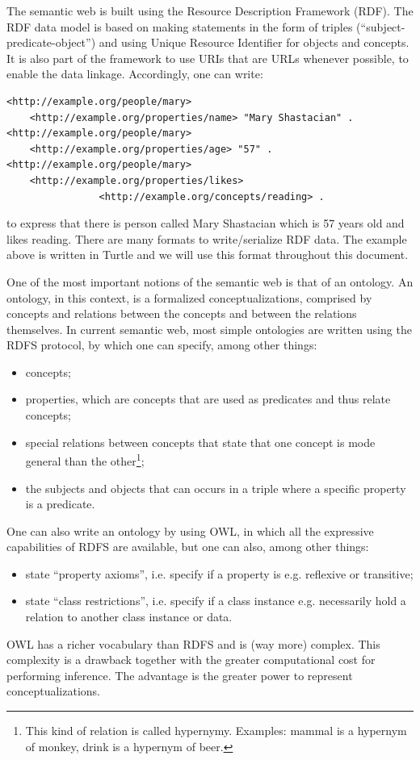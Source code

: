 \documentclass[12pt,fleqn]{article}
\begin{document}
The semantic web is built using the Resource Description Framework (RDF).
The RDF data model is based on making statements in the form of triples
(``subject-predicate-object'') and using Unique Resource Identifier for
objects and concepts.
It is also part of the framework to use URIs that are URLs whenever possible,
to enable the data linkage.
Accordingly, one can write:
\begin{Verbatim}[fontsize=\footnotesize]
<http://example.org/people/mary>
	<http://example.org/properties/name> "Mary Shastacian" .
<http://example.org/people/mary>
	<http://example.org/properties/age> "57" .
<http://example.org/people/mary> 
	<http://example.org/properties/likes> 
                <http://example.org/concepts/reading> .
\end{Verbatim}
\noindent to express that there is person called Mary Shastacian which is 57 years old and likes reading.
There are many formats to write/serialize RDF data.
The example above is written in Turtle and we will use this format throughout this document.

One of the most important notions of the semantic web is that of an ontology.
An ontology, in this context, is a formalized conceptualizations, comprised by
concepts and relations between the concepts and between the relations themselves.
In current semantic web, most simple ontologies are written using the RDFS protocol,
by which one can specify, among other things:
\begin{itemize}
	\item concepts;
	\item properties, which are concepts that are used as predicates and thus relate concepts;
	\item special relations between concepts that state that one concept is mode general than the other\footnote{This
		kind of relation is called hypernymy. Examples: mammal is a hypernym of monkey, drink is a hypernym of beer.};
	\item the subjects and objects that can occurs in a triple where a specific property is a predicate.
\end{itemize}

One can also write an ontology by using OWL,
in which all the expressive capabilities of RDFS are
available, but one can also, among other things:
\begin{itemize}
	\item state ``property axioms'', i.e. specify if a property is e.g. reflexive or transitive;
	\item state ``class restrictions'', i.e. specify if a class instance e.g. necessarily hold a relation to another class instance or data.
\end{itemize}
OWL has a richer vocabulary than RDFS and is (way more) complex.
This complexity is a drawback together with the greater computational cost
for performing inference.
The advantage is the greater power to represent conceptualizations.
\end{document}
